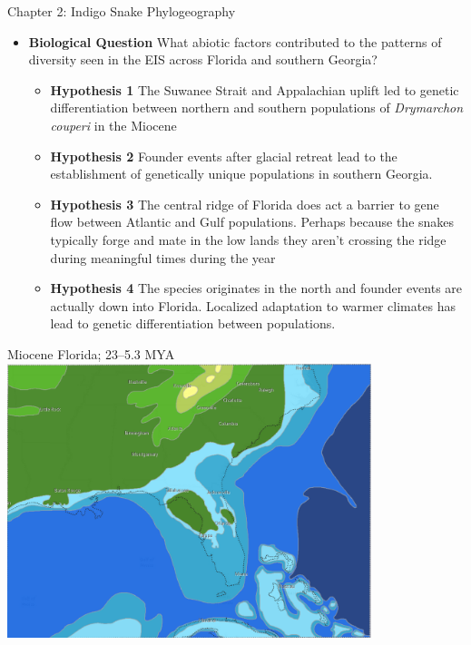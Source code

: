 \documentclass[10pt,aspectratio=169]{beamer}
\begin{document}
\begin{frame}{Chapter 2: Indigo Snake Phylogeography}
      \begin{itemize}
        \item \textbf{Biological Question} What abiotic factors contributed to the patterns of diversity seen in the EIS across Florida and southern Georgia?
        \begin{itemize}
        
        \item \textbf{Hypothesis 1} The Suwanee Strait and Appalachian uplift led to genetic differentiation between northern and southern populations of \textit{Drymarchon couperi} in the Miocene
        \item \textbf{Hypothesis 2} Founder events after glacial retreat lead to the     establishment of genetically unique populations in southern Georgia. 
        \item \textbf{Hypothesis 3} The central ridge of Florida does act a barrier to gene flow between Atlantic and Gulf populations. Perhaps because the snakes typically forge and mate in the low lands they aren't crossing the ridge during meaningful times during the year
        \item \textbf{Hypothesis 4} The species originates in the north and founder events are actually down into Florida. Localized adaptation to warmer climates has lead to genetic differentiation between populations. 
      \end{itemize}
    \end{itemize}  
\end{frame}

\begin{frame}{Miocene Florida; 23--5.3 MYA }
  \centering
  \includegraphics[height = 8cm]{media/florida-miocene.png}
\end{frame}
\end{document}
